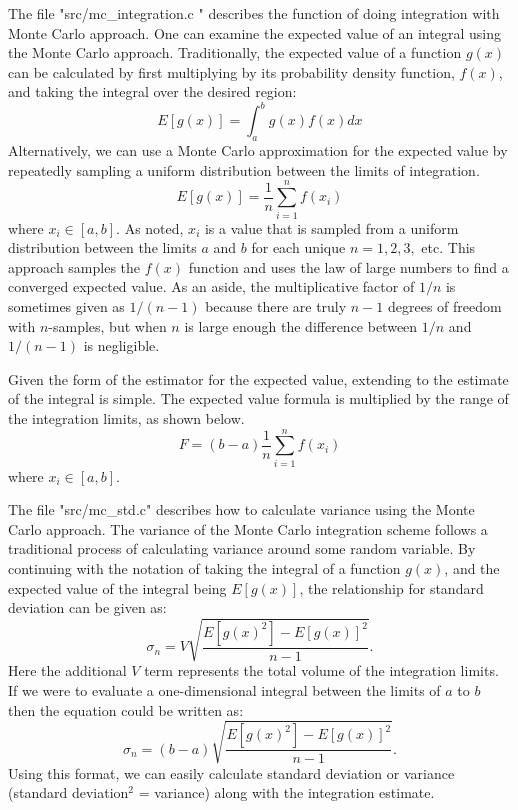 \documentclass{book}
\begin{document}
The file "src/mc\_integration.c " describes the function of doing integration with Monte Carlo approach.
One can examine the expected value of an integral using the Monte Carlo approach. Traditionally, the
expected value of a function $g(x)$ can be calculated by first multiplying by its probability density function,
$f(x)$, and taking the integral over the desired region:
$$
 E [ g(x) ] = \int_a^b g(x) f(x) dx
$$
Alternatively, we can use a Monte Carlo approximation for the expected value by repeatedly
sampling a uniform distribution between the limits of integration.
$$
 E [ g(x) ] = \frac{1}{n} \sum_{i=1}^n f(x_i)
$$
where $x_i \in [a, b]$. As noted, $x_i$  is a value that is sampled from a uniform distribution
between the limits $a$ and $b$ for each unique $n = 1,2,3,$ etc. This approach samples the $f(x)$
function and uses the law of large numbers to find a converged expected value.
As an aside, the multiplicative factor of $1/n$ is sometimes given as $1/(n-1)$ because there are
truly $n-1$ degrees of freedom with $n$-samples, but when $n$ is large enough the difference between
$1/n$ and $1/(n-1)$ is negligible.

Given the form of the estimator for the expected value, extending to the estimate of the integral is simple.
The expected value formula is multiplied by the range of the integration limits, as shown below.
$$
 F = (b-a) \frac{1}{n} \sum_{i=1}^n f(x_i)
$$
where $x_i \in [a, b]$.

The file "src/mc\_std.c" describes how to calculate variance using the Monte Carlo approach. The variance of
the Monte Carlo integration scheme follows a traditional process of calculating variance around some random variable.
By continuing with the notation of taking the integral of a function $g(x)$, and the expected value of the integral being $E[g(x)]$,
the relationship for standard deviation can be given as:
$$
 \sigma_n = V \sqrt{\frac{E[g(x)^2] - E[g(x)]^2}{n-1}}.
$$
Here the additional $V$ term represents the total volume of the integration limits. If we were to evaluate a one-dimensional
integral between the limits of $a$ to $b$ then the equation could be written as:
$$
 \sigma_n = (b-a) \sqrt{\frac{E[g(x)^2] - E[g(x)]^2}{n-1}}.
$$
Using this format, we can easily calculate standard deviation or variance (standard deviation$^2$ = variance) along with the integration estimate.
\end{document}
